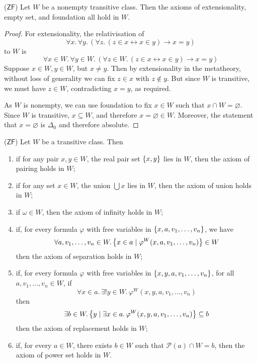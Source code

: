 \begin{lemma}
    (\( \mathsf{ZF} \))
    Let \( W \) be a nonempty transitive class.
    Then the axioms of extensionality, empty set, and foundation all hold in \( W \).
\end{lemma}
\begin{proof}
    For extensionality, the relativisation of
    \[ \forall x.\, \forall y.\, (\forall z.\, (z \in x \leftrightarrow x \in y) \to x = y) \]
    to \( W \) is
    \[ \forall x \in W.\, \forall y \in W.\, (\forall z \in W.\, (z \in x \leftrightarrow x \in y) \to x = y) \]
    Suppose \( x \in W, y \in W \), but \( x \neq y \).
    Then by extensionality in the metatheory, without loss of generality we can fix \( z \in x \) with \( z \notin y \).
    But since \( W \) is transitive, we must have \( z \in W \), contradicting \( x = y \), as required.

    As \( W \) is nonempty, we can use foundation to fix \( x \in W \) such that \( x \cap W = \varnothing \).
    Since \( W \) is transitive, \( x \subseteq W \), and therefore \( x = \varnothing \in W \).
    Moreover, the statement that \( x = \varnothing \) is \( \Delta_0 \) and therefore absolute.

\end{proof}
\begin{lemma}
    (\( \mathsf{ZF} \))
    Let \( W \) be a transitive class.
    Then
    \begin{enumerate}
        \item if for any pair \( x, y \in W \), the real pair set \( \qty{x, y} \) lies in \( W \), then the axiom of pairing holds in \( W \);
        \item if for any set \( x \in W \), the union \( \bigcup x \) lies in \( W \), then the axiom of union holds in \( W \);
        \item if \( \omega \in W \), then the axiom of infinity holds in \( W \);
        \item if, for every formula \( \varphi \) with free variables in \( \qty{x, a, v_1, \dots, v_n} \), we have
        \[ \forall a, v_1, \dots, v_n \in W.\, \qty{x \in a \mid \varphi^W(x, a, v_1, \dots, v_n)} \in W \]
        then the axiom of separation holds in \( W \);
        \item if, for every formula \( \varphi \) with free variables in \( \qty{x, y, a, v_1, \dots, v_n} \), for all \( a, v_1, \dots, v_n \in W \), if
        \[ \forall x \in a.\, \exists! y \in W.\, \varphi^W(x, y, a, v_1, \dots, v_n) \]
        then
        \[ \exists b \in W.\, \qty{y \mid \exists x \in a.\, \varphi^W(x, y, a, v_1, \dots, v_n)} \subseteq b \]
        then the axiom of replacement holds in \( W \);
        \item if, for every \( a \in W \), there exists \( b \in W \) such that \( \mathcal P(a) \cap W = b \), then the axiom of power set holds in \( W \).
    \end{enumerate}
\end{lemma}
